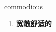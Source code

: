 
\begin{frame}
{\huge commodious}
\begin{center}
\begin{enumerate}\Large
  \item \textbf{宽敞舒适的}
\end{enumerate}
\end{center}
\end{frame}
